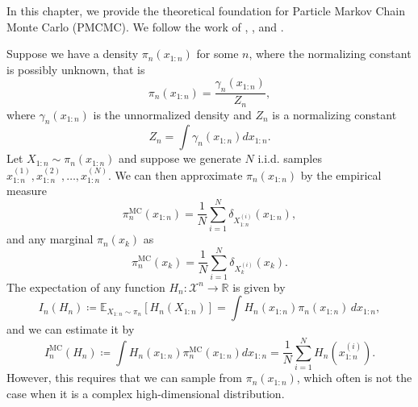 In this chapter, we provide the theoretical foundation for Particle Markov Chain Monte Carlo (PMCMC). We follow the work of \cite{Andrieu}, \cite{Doucet}, and \cite{kroese2013handbook}.

Suppose we have a density $\pi_n(x_{1:n})$ for some $n$, where the normalizing constant is possibly unknown, that is
\begin{equation}
	\pi_n(x_{1:n})=\frac{\gamma_n(x_{1:n})}{Z_n}, \label{eq:density}
\end{equation}
where $\gamma_n(x_{1:n})$ is the unnormalized density and $Z_n$ is a normalizing constant
\begin{equation}
	Z_n=\int \gamma_n(x_{1:n})dx_{1:n}.	\label{eq:normalizing_constant}
\end{equation}
Let $X_{1:n}\sim \pi_n(x_{1:n})$ and suppose we generate $N$ i.i.d. samples $x_{1:n}^{(1)},x_{1:n}^{(2)},\dots,x_{1:n}^{(N)}$. We can then approximate $\pi_n(x_{1:n})$ by the empirical measure
\[
{\pi}_n^{\text{MC}}(x_{1:n})=\frac{1}{N} \sum_{i=1}^N \delta_{X_{1:n}^{(i)}}(x_{1:n}),
\]
and any marginal $\pi_n(x_k)$ as
\[
{\pi}_n^{\text{MC}}(x_k)=\frac{1}{N} \sum_{i=1}^N \delta_{X_{k}^{(i)}}(x_{k}).
\]
The expectation of any function $H_n: \mathcal{X}^n \to \mathbb{R}$ is given by
\[
I_n(H_n)\coloneq \mathbb{E}_{X_{1:n} \sim \pi_n}[H_n(X_{1:n})]=\int H_n(x_{1:n})\pi_n(x_{1:n})\, dx_{1:n},
\]
and we can estimate it by
\[
I_n^{\text{MC}}(H_n) \coloneq \int H_n(x_{1:n})\pi_n^{\text{MC}}(x_{1:n})dx_{1:n}=\frac{1}{N}\sum_{i=1}^NH_n(x_{1:n}^{(i)}).
\]
However, this requires that we can sample from $\pi_n(x_{1:n})$, which often is not the case when it is a complex high-dimensional distribution. 
